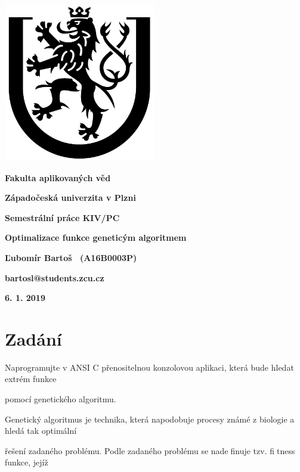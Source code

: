 \documentclass{article}
\begin{document}
  




\centerline{\includegraphics[width=0.5\textwidth]{logo}}




\centerline{{\Large \textbf{Fakulta aplikovaných věd}}}
\centerline{{\Large \textbf{Západočeská univerzita v Plzni}}}



\centerline{{\Large \textbf{Semestrální práce KIV/PC}}}
\centerline{{\Large \textbf{Optimalizace funkce geneticým algoritmem}}}




\hspace*{\fill} \textbf{Ľubomír Bartoš \ (A16B0003P)}

\hspace*{\fill} \textbf{bartosl@students.zcu.cz}

\hspace*{\fill} \textbf{6. 1. 2019}



\newpage







\tableofcontents
\newpage

\section{Zadání}

Naprogramujte v ANSI C přenositelnou konzolovou aplikaci, která bude hledat extrém funkce

pomocí genetického algoritmu.

Genetický algoritmus je technika, která napodobuje procesy známé z biologie a hledá tak optimální

řešení zadaného problému. Podle zadaného problému se nadefinuje tzv. fitness funkce, jejíž
\end{document}
